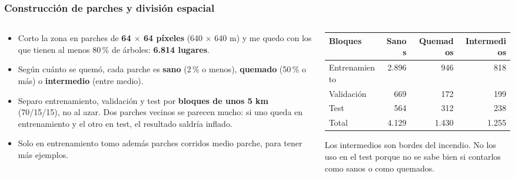 \documentclass[10pt,aspectratio=169]{beamer}
\begin{document}
\begin{frame}
  \frametitle{Construcción de parches y división espacial}
  \small
  \begin{columns}[T]
    \begin{column}{.52\textwidth}
      \begin{itemize}\itemsep0.25em
        \item Corto la zona en parches de \textbf{64 $\times$ 64 píxeles} (640 $\times$ 640 m) y me quedo con los que tienen al menos 80\,\% de árboles: \textbf{6.814 lugares}.
        \item Según cuánto se quemó, cada parche es \textbf{sano} (2\,\% o menos), \textbf{quemado} (50\,\% o más) o \textbf{intermedio} (entre medio).
        \item Separo entrenamiento, validación y test por \textbf{bloques de unos 5 km} (70/15/15), no al azar. Dos parches vecinos se parecen mucho: si uno queda en entrenamiento y el otro en test, el resultado saldría inflado.
        \item Solo en entrenamiento tomo además parches corridos medio parche, para tener más ejemplos.
      \end{itemize}
    \end{column}
    \begin{column}{.44\textwidth}
      \begin{center}
        \footnotesize
        \begin{tabular}{@{}lrrr@{}}
          \toprule
          \textbf{Bloques} & \textbf{Sanos} & \textbf{Quemados} & \textbf{Intermedios} \\
          \midrule
          Entrenamiento & 2.896 & 946 & 818 \\
          Validación & 669 & 172 & 199 \\
          Test & 564 & 312 & 238 \\
          \midrule
          Total & 4.129 & 1.430 & 1.255 \\
          \bottomrule
        \end{tabular}
      \end{center}
      \vspace{0.4em}
      Los intermedios son bordes del incendio. No los uso en el test porque no se sabe bien si contarlos como sanos o como quemados.
    \end{column}
  \end{columns}
\end{frame}
\end{document}
